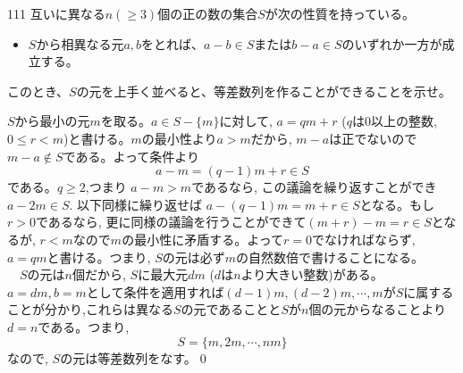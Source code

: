 \begin{prob}{111}{}{}
 互いに異なる$n (\ge 3)$個の正の数の集合$S$が次の性質を持っている。
 \begin{itemize}
  \item[性質:] $S$から相異なる元$a, b$をとれば、$a-b\in S$または$b-a\in S$のいずれか一方が成立する。
 \end{itemize}
 このとき、$S$の元を上手く並べると、等差数列を作ることができることを示せ。
\end{prob}

$S$から最小の元$m$を取る。$a\in S-\{m\}$に対して, $a=qm+r$  ($q$は0以上の整数, $0\leq r<m$)と書ける。$m$の最小性より$a>m$だから, $m-a$は正でないので$m-a\notin S$である。よって条件より
\[a-m=(q-1)m+r\in S\]
である。$q\geq 2$,つまり $a-m>m$であるなら, この議論を繰り返すことができ$a-2m\in S$. 以下同様に繰り返せば $a-(q-1)m=m+r\in S$となる。もし$r>0$であるなら, 更に同様の議論を行うことができて$(m+r)-m=r\in S$となるが, $r<m$なので$m$の最小性に矛盾する。よって$r=0$でなければならず, $a=qm$と書ける。つまり, $S$の元は必ず$m$の自然数倍で書けることになる。\\
　$S$の元は$n$個だから, $S$に最大元$dm$ ($d$は$n$より大きい整数)がある。$a=dm, b=m$として条件を適用すれば$(d-1)m,(d-2)m,\cdots, m$が$S$に属することが分かり,これらは異なる$S$の元であることと$S$が$n$個の元からなることより$d=n$である。つまり,
\[S=\{m,2m,\cdots, nm\}\]
なので, $S$の元は等差数列をなす。\qed